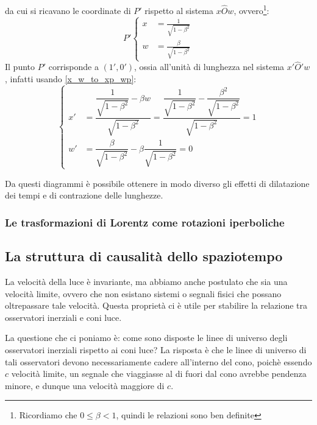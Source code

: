 da cui si ricavano le coordinate di $P'$ rispetto al sistema $x \hat O w$, ovvero\footnote{Ricordiamo che $0 \leq \beta < 1 $, 
quindi le relazioni sono ben definite}:
\begin{equation}
P' \left\{\begin{aligned} 
x &= \frac{1}{\sqrt{1-\beta^2}}\\
w &= \frac{\beta}{\sqrt{1-\beta^2}}
\end{aligned}\right. 
\end{equation}
Il punto $P'$ corrisponde a $(1', 0')$, ossia
all'unità di lunghezza nel sistema $x' \hat O' w$, infatti usando \ref{x_w_to_xp_wp}:
\begin{equation}
 \left\{
 \begin{aligned}
 x' &= \dfrac{\dfrac{1}{\sqrt{1-\beta^2}}-\beta w}{\sqrt{1-\beta^2}} = \dfrac{\dfrac{1}{\sqrt{1-\beta^2}}-\dfrac{\beta^2}{\sqrt{1-\beta^2}}}{\sqrt{1-\beta^2}} = 1 \\
 w' &= \dfrac{\beta}{\sqrt{1-\beta^2}} - \beta \dfrac{1}{\sqrt{1-\beta^2}} = 0
 \end{aligned}
 \right. 
\end{equation}

Da questi diagrammi è possibile ottenere in modo diverso gli effetti di dilatazione dei tempi e di contrazione delle lunghezze.

\subsubsection{Le trasformazioni di Lorentz come rotazioni iperboliche}


\subsection{La struttura di causalità dello spaziotempo}
La velocità della luce è invariante, ma abbiamo anche postulato che sia una
velocità limite, ovvero che non esistano sistemi o segnali fisici che possano
oltrepassare tale velocità. Questa proprietà ci è utile per stabilire la relazione
tra osservatori inerziali e coni luce.

La questione che ci poniamo è: come sono disposte le linee di universo
degli osservatori inerziali rispetto ai coni luce? La risposta è che le linee
di universo di tali osservatori devono necessariamente cadere all'interno del
cono, poichè essendo $c$ velocità limite, un segnale che viaggiasse al di fuori
dal cono avrebbe pendenza minore, e dunque una velocità maggiore di $c$.

